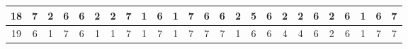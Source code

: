 \begin{sidewaystable}[]
\begin{tabular}{|c|c|c|c|c|c|c|c|c|c|c|c|c|c|c|c|c|c|c|c|c|c|c|c|c|}
    18      & 7                                               & 2                                               & 6                                               & 6                                               & 2                                               & 2                                               & 7                                               & 1                                               & 6                                               & 1                                                & 7                                                & 6                                                & 6                                               & 2                                               & 5                                               & 6                                               & 2                                               & 2                                               & 6                                               & 2                                                 & 6                                               & 1                                                & 6                                                & 7                                                \\ \hline
    19      & 6                                               & 1                                               & 7                                               & 6                                               & 1                                               & 1                                               & 7                                               & 1                                               & 7                                               & 1                                                & 7                                                & 7                                                & 7                                               & 1                                               & 6                                               & 6                                               & 4                                               & 4                                               & 6                                               & 2                                                 & 6                                               & 1                                                & 7                                                & 7                                                \\ \hline

\end{tabular}
\end{sidewaystable}
